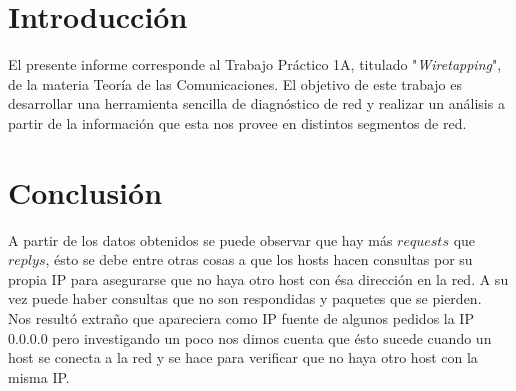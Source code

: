 \documentclass{article}
\begin{document}





\maketitle


\section{Introducción}
El presente informe corresponde al Trabajo Práctico 1A, titulado
"\emph{Wiretapping}", de la materia Teoría de las Comunicaciones. El objetivo
de este trabajo es desarrollar una herramienta sencilla de diagnóstico de red
y realizar un análisis a partir de la información que esta nos provee en
distintos segmentos de red.

\newpage


\section{Conclusión}
A partir de los datos obtenidos se puede observar que hay más $requests$ que $replys$, ésto se debe entre otras cosas a que los hosts hacen consultas por su propia IP para asegurarse que no haya otro host con ésa dirección en la red. A su vez puede haber consultas que no son respondidas y paquetes que se pierden.\\
Nos resultó extraño que apareciera como IP fuente de algunos pedidos la IP 0.0.0.0 pero investigando un poco nos dimos cuenta que ésto sucede cuando un host se conecta a la red y se hace para verificar que no haya otro host con la misma IP.
\end{document}
